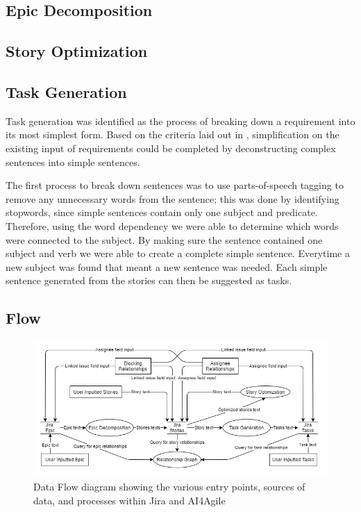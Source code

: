 \subsection{Epic Decomposition}


\subsection{Story Optimization}


\subsection{Task Generation}

Task generation was identified as the process of breaking down a requirement into its most simplest form. Based on the criteria laid out in , simplification on the existing input of requirements could be completed by deconstructing complex sentences into simple sentences. 

The first process to break down sentences was to use parts-of-speech tagging to remove any unnecessary words from the sentence; this was done by identifying stopwords, since simple sentences contain only one subject and predicate. Therefore, using the word dependency we were able to determine which words were connected to the subject. By making sure the sentence contained one subject and verb we were able to create a complete simple sentence. Everytime a new subject was found that meant a new sentence was needed. Each simple sentence generated from the stories can then be suggested as tasks.

\subsection{Flow}

\begin{figure}
\centerline{\includegraphics[width=\textwidth,height=\textheight,keepaspectratio]{./figure/DataflowDiagram.png}}
\caption{Data Flow diagram showing the various entry points, sources of data, and processes within Jira and AI4Agile}
\end{figure}

